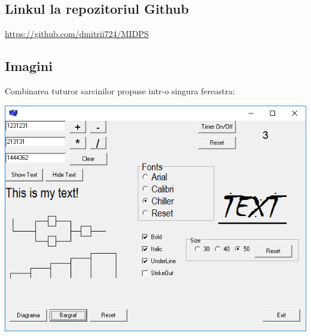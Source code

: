 \subsection{Linkul la repozitoriul Github}
\begin{center}
\url{https://github.com/dmitrii724/MIDPS}
\end{center}

\subsection{Imagini}
Combinarea tuturor sarcinilor propuse intr-o singura fereastra:\\
\begin{center}
\includegraphics[scale=1]{images/d}\\
\end{center}

\clearpage